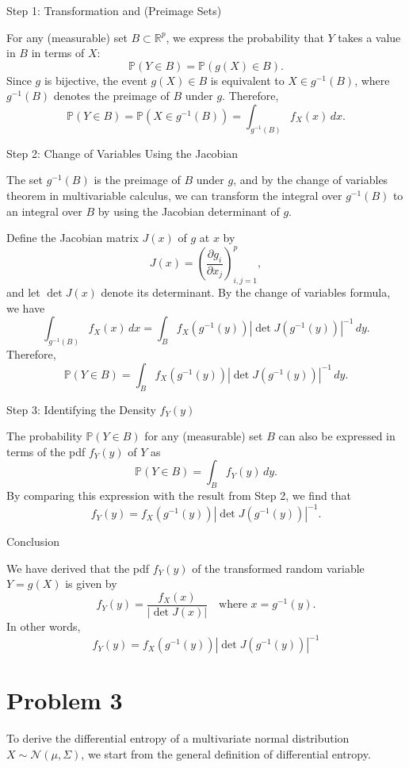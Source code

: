 \documentclass{article}
\begin{document}
Step 1: Transformation and (Preimage Sets)

For any (measurable) set \( B \subset \mathbb{R}^p \), we express the probability that \( Y \) takes a value in \( B \) in terms of \( X \):
\[
\mathbb{P}(Y \in B) = \mathbb{P}(g(X) \in B).
\]
Since \( g \) is bijective, the event \( g(X) \in B \) is equivalent to \( X \in g^{-1}(B) \), where \( g^{-1}(B) \) denotes the preimage of \( B \) under \( g \). Therefore,
\[
\mathbb{P}(Y \in B) = \mathbb{P}(X \in g^{-1}(B)) = \int_{g^{-1}(B)} f_X(x) \, dx.
\]

Step 2: Change of Variables Using the Jacobian

The set \( g^{-1}(B) \) is the preimage of \( B \) under \( g \), and by the change of variables theorem in multivariable calculus, we can transform the integral over \( g^{-1}(B) \) to an integral over \( B \) by using the Jacobian determinant of \( g \).

Define the Jacobian matrix \( J(x) \) of \( g \) at \( x \) by
\[
J(x) = \left( \frac{\partial g_i}{\partial x_j} \right)_{i,j=1}^p,
\]
and let \( \det J(x) \) denote its determinant. By the change of variables formula, we have
\[
\int_{g^{-1}(B)} f_X(x) \, dx = \int_B f_X(g^{-1}(y)) \left| \det J(g^{-1}(y)) \right|^{-1} \, dy.
\]
Therefore,
\[
\mathbb{P}(Y \in B) = \int_B f_X(g^{-1}(y)) \left| \det J(g^{-1}(y)) \right|^{-1} \, dy.
\]

Step 3: Identifying the Density \( f_Y(y) \)

The probability \( \mathbb{P}(Y \in B) \) for any (measurable) set \( B \) can also be expressed in terms of the pdf \( f_Y(y) \) of \( Y \) as
\[
\mathbb{P}(Y \in B) = \int_B f_Y(y) \, dy.
\]
By comparing this expression with the result from Step 2, we find that
\[
f_Y(y) = f_X(g^{-1}(y)) \left| \det J(g^{-1}(y)) \right|^{-1}.
\]

Conclusion

We have derived that the pdf \( f_Y(y) \) of the transformed random variable \( Y = g(X) \) is given by
\[
f_Y(y) = \frac{f_X(x)}{| \det J(x) |} \quad \text{where } x = g^{-1}(y).
\]
In other words,
\[
f_Y(y) = f_X(g^{-1}(y)) \left| \det J(g^{-1}(y)) \right|^{-1}
\]

\section*{Problem 3}

To derive the differential entropy of a multivariate normal distribution \( X \sim \mathcal{N}(\mu, \Sigma) \), we start from the general definition of differential entropy.
\end{document}
